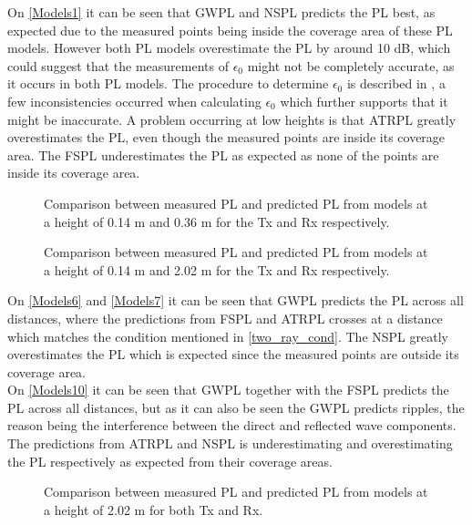 


On \autoref{Models1} it can be seen that GWPL and NSPL predicts the PL best, as expected due to the measured points being inside the coverage area of these PL models. However both PL models overestimate the PL by around 10 dB, which could suggest that the measurements of $\epsilon_0$ might not be completely accurate, as it occurs in both PL models. The procedure to determine $\epsilon_0$ is described in \cite{Kim}, a few inconsistencies occurred when calculating $\epsilon_0$ which further supports that it might be inaccurate. A problem occurring at low heights is that ATRPL greatly overestimates the PL, even though the measured points are inside its coverage area. The FSPL underestimates the PL as expected as none of the points are inside its coverage area.


\begin{figure}[H]
\centering

\caption{Comparison between measured PL and predicted PL from models at a height of 0.14 m and 0.36 m for the Tx and Rx respectively.}
\label{Models6}
\end{figure}


\begin{figure}[H]
\centering

\caption{Comparison between measured PL and predicted PL from models at a height of 0.14 m and 2.02 m for the Tx and Rx respectively.}
\label{Models7}
\end{figure}

On \autoref{Models6} and \autoref{Models7} it can be seen that GWPL predicts the PL across all distances, where the predictions from FSPL and ATRPL crosses at a distance which matches the condition mentioned in \eqref{two_ray_cond}. The NSPL greatly overestimates the PL which is expected since the measured points are outside its coverage area.\\

On \autoref{Models10} it can be seen that GWPL together with the FSPL predicts the PL across all distances, but as it can also be seen the GWPL predicts ripples, the reason being the interference between the direct and reflected wave components. The predictions from ATRPL and NSPL is underestimating and overestimating the PL respectively as expected from their coverage areas.

\begin{figure}[H]
\centering

\caption{Comparison between measured PL and predicted PL from models at a height of 2.02 m for both Tx and Rx.}
\label{Models10}
\end{figure}





